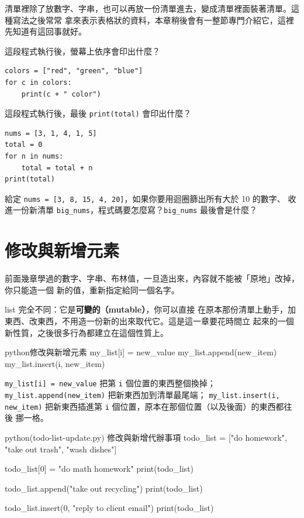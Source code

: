 清單裡除了放數字、字串，也可以再放一份清單進去，變成清單裡面裝著清單。這種寫法之後常常
拿來表示表格狀的資料，本章稍後會有一整節專門介紹它，這裡先知道有這回事就好。

\begin{drills}[label=drills:list-loop]
\item 這段程式執行後，螢幕上依序會印出什麼？
\begin{verbatim}
colors = ["red", "green", "blue"]
for c in colors:
    print(c + " color")
\end{verbatim}
\item 這段程式執行後，最後 \texttt{print(total)} 會印出什麼？
\begin{verbatim}
nums = [3, 1, 4, 1, 5]
total = 0
for n in nums:
    total = total + n
print(total)
\end{verbatim}
\item 給定 \texttt{nums = [3, 8, 15, 4, 20]}，如果你要用迴圈篩出所有大於 10 的數字、
收進一份新清單 \texttt{big\_nums}，程式碼要怎麼寫？\texttt{big\_nums} 最後會是什麼？
\end{drills}

\section{修改與新增元素}
\label{sec:list-add}

前面幾章學過的數字、字串、布林值，一旦造出來，內容就不能被「原地」改掉，你只能造一個
新的值，重新指定給同一個名字。

list 完全不同：它是\textbf{可變的（mutable）}，你可以直接
在原本那份清單上動手，加東西、改東西，不用造一份新的出來取代它。這是這一章要花時間立
起來的一個新性質，之後很多行為都建立在這個性質上。

\begin{code}{python}{修改與新增元素}
my_list[i] = new_value
my_list.append(new_item)
my_list.insert(i, new_item)
\end{code}

\texttt{my\_list[i] = new\_value} 把第 \texttt{i} 個位置的東西整個換掉；
\texttt{my\_list.append(new\_item)} 把新東西加到清單最尾端；
\texttt{my\_list.insert(i,
new\_item)} 把新東西插進第 \texttt{i} 個位置，原本在那個位置（以及後面）的東西都往後
挪一格。

\begin{example}{python}{(todo-list-update.py) 修改與新增代辦事項}
todo_list = ["do homework", "take out trash", "wash dishes"]

todo_list[0] = "do math homework"
print(todo_list)

todo_list.append("take out recycling")
print(todo_list)

todo_list.insert(0, "reply to client email")
print(todo_list)
\end{example}

